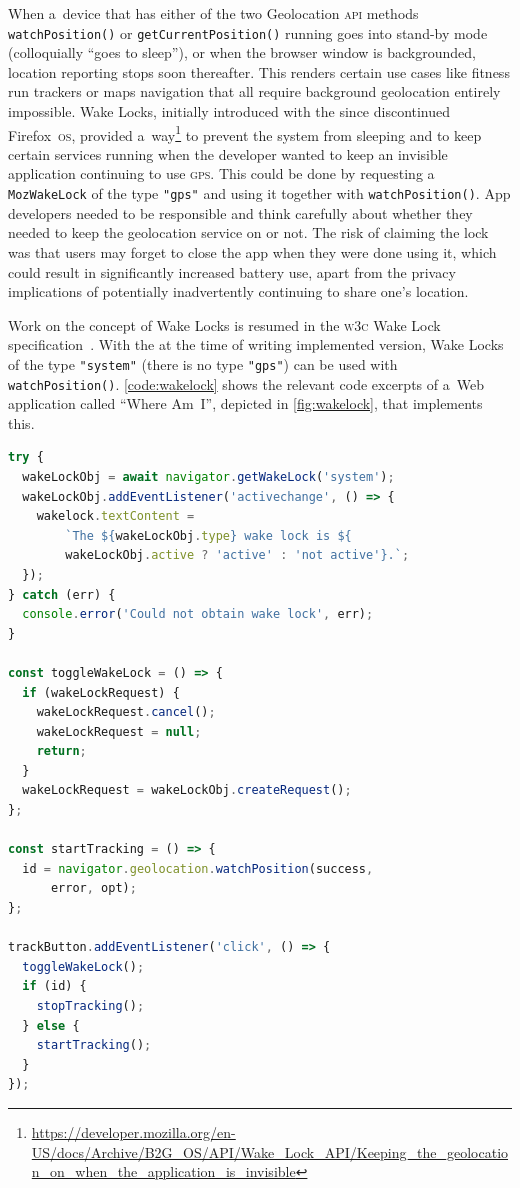 \documentclass[sigconf,hyphens]{acmart}
\begin{document}
When a~device that has either of the two Geolocation \textsc{api} methods
\texttt{watchPosition()} or \texttt{getCurrentPosition()} running
goes into stand-by mode (colloquially ``goes to sleep''), or
when the browser window is backgrounded, location reporting stops soon thereafter.
This renders certain use cases like fitness run trackers or maps navigation
that all require background geolocation entirely impossible.
Wake Locks, initially introduced with the since discontinued Firefox~\textsc{os},
provided a~way\footnote{\url{https://developer.mozilla.org/en-US/docs/Archive/B2G_OS/API/Wake_Lock_API/Keeping_the_geolocation_on_when_the_application_is_invisible}}
to prevent the system from sleeping and to keep certain services running
when the developer wanted to keep an invisible application continuing to use \textsc{gps}.
This could be done by requesting a \texttt{MozWakeLock} of the type \texttt{"gps"}
and using it together with \texttt{watchPosition()}.
App developers needed to be responsible and think carefully about
whether they needed to keep the geolocation service on or not.
The risk of claiming the lock was that users may forget to close the app
when they were done using it, which could result in significantly increased battery use,
apart from the privacy implications of potentially inadvertently continuing to share one's location.

Work on the concept of Wake Locks is resumed in the \textsc{w3c}
Wake Lock specification~\cite{bogdanovich2017wakelock}.
With the at the time of writing implemented version,
Wake Locks of the type \texttt{"system"}
(there is no type \texttt{"gps"}) can be used with \texttt{watchPosition()}.
\autoref{code:wakelock} shows the relevant code excerpts of a~Web application
called ``Where Am~I'', depicted in \autoref{fig:wakelock}, that implements this.

\begin{lstlisting}[caption={Using the Wake Lock \textsc{api} for background geolocation tracking},
  label=code:wakelock, language=JavaScript, float=h] 
try {
  wakeLockObj = await navigator.getWakeLock('system');
  wakeLockObj.addEventListener('activechange', () => {
    wakelock.textContent =
        `The ${wakeLockObj.type} wake lock is ${
        wakeLockObj.active ? 'active' : 'not active'}.`;
  });
} catch (err) {
  console.error('Could not obtain wake lock', err);
}

const toggleWakeLock = () => {
  if (wakeLockRequest) {
    wakeLockRequest.cancel();
    wakeLockRequest = null;      
    return;
  }
  wakeLockRequest = wakeLockObj.createRequest();
};
    
const startTracking = () => {  
  id = navigator.geolocation.watchPosition(success,
      error, opt);  
};

trackButton.addEventListener('click', () => {
  toggleWakeLock();    
  if (id) {
    stopTracking();
  } else {
    startTracking();
  }    
});
\end{lstlisting}
\end{document}
